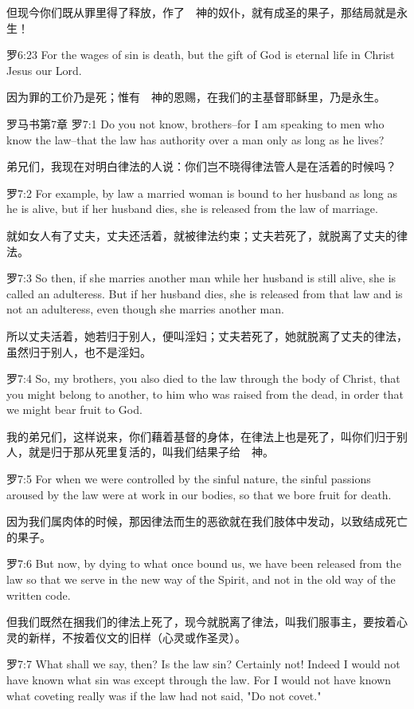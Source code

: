 \documentclass[a4paper,11pt,onecolumn,twoside]{ctexart}
\begin{document}
\begin{multicols}{2}
 但现今你们既从罪里得了释放，作了　神的奴仆，就有成圣的果子，那结局就是永生！


 罗6:23
 For the wages of sin is death, but the gift of God is eternal life in Christ Jesus our Lord.

 因为罪的工价乃是死；惟有　神的恩赐，在我们的主基督耶稣里，乃是永生。


 罗马书第7章
 罗7:1
 Do you not know, brothers--for I am speaking to men who know the law--that the law has authority over a man only as long as he lives?

 弟兄们，我现在对明白律法的人说：你们岂不晓得律法管人是在活着的时候吗？


 罗7:2
 For example, by law a married woman is bound to her husband as long as he is alive, but if her husband dies, she is released from the law of marriage.

 就如女人有了丈夫，丈夫还活着，就被律法约束；丈夫若死了，就脱离了丈夫的律法。


 罗7:3
 So then, if she marries another man while her husband is still alive, she is called an adulteress. But if her husband dies, she is released from that law and is not an adulteress, even though she marries another man.

 所以丈夫活着，她若归于别人，便叫淫妇；丈夫若死了，她就脱离了丈夫的律法，虽然归于别人，也不是淫妇。


 罗7:4
 So, my brothers, you also died to the law through the body of Christ, that you might belong to another, to him who was raised from the dead, in order that we might bear fruit to God.

 我的弟兄们，这样说来，你们藉着基督的身体，在律法上也是死了，叫你们归于别人，就是归于那从死里复活的，叫我们结果子给　神。


 罗7:5
 For when we were controlled by the sinful nature, the sinful passions aroused by the law were at work in our bodies, so that we bore fruit for death.

 因为我们属肉体的时候，那因律法而生的恶欲就在我们肢体中发动，以致结成死亡的果子。


 罗7:6
 But now, by dying to what once bound us, we have been released from the law so that we serve in the new way of the Spirit, and not in the old way of the written code.

 但我们既然在捆我们的律法上死了，现今就脱离了律法，叫我们服事主，要按着心灵的新样，不按着仪文的旧样（心灵或作圣灵）。


 罗7:7
 What shall we say, then? Is the law sin? Certainly not! Indeed I would not have known what sin was except through the law. For I would not have known what coveting really was if the law had not said, "Do not covet."


\end{multicols}
\end{document}

